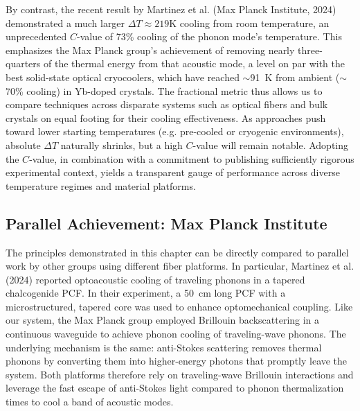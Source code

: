 By contrast, the recent result by Martinez et al. (Max Planck Institute, 2024) \cite{blazquez2024optoacoustic} demonstrated a much larger \(\Delta T \approx 219\text{K}\) cooling from room temperature, an unprecedented \(C\)-value of 73\% cooling of the phonon mode’s temperature. This emphasizes the Max Planck group’s achievement of removing nearly three-quarters of the thermal energy from that acoustic mode, a level on par with the best solid-state optical cryocoolers, which have reached \(\sim\)\SI{91}{\kelvin} from ambient (\(\sim\)70\% cooling) in Yb-doped crystals. \cite{zhang2024experimental} The fractional metric thus allows us to compare techniques across disparate systems such as optical fibers and bulk crystals on equal footing for their cooling effectiveness. As approaches push toward lower starting temperatures (e.g. pre-cooled or cryogenic environments), absolute \(\Delta T\) naturally shrinks, but a high \(C\)-value will remain notable. Adopting the \(C\)-value, in combination with a commitment to publishing sufficiently rigorous experimental context, \cite{zhang2024experimental} yields a transparent gauge of performance across diverse temperature regimes and material platforms.

\subsection{Parallel Achievement: Max Planck Institute}
\label{Cooling:subsec:Parallel Achievement}

The principles demonstrated in this chapter can be directly compared to parallel work by other groups using different fiber platforms. In particular, Martinez et al. (2024) \cite{blazquez2024optoacoustic} reported optoacoustic cooling of traveling phonons in a tapered chalcogenide \ac{PCF}. In their experiment, a \SI{50}{\centi\meter} long PCF with a microstructured, tapered core was used to enhance optomechanical coupling. Like our system, the Max Planck group employed Brillouin backscattering in a continuous waveguide to achieve phonon cooling of traveling-wave phonons. The underlying mechanism is the same: anti-Stokes scattering removes thermal phonons by converting them into higher-energy photons that promptly leave the system. Both platforms therefore rely on traveling-wave Brillouin interactions and leverage the fast escape of anti-Stokes light compared to phonon thermalization times to cool a band of acoustic modes.

